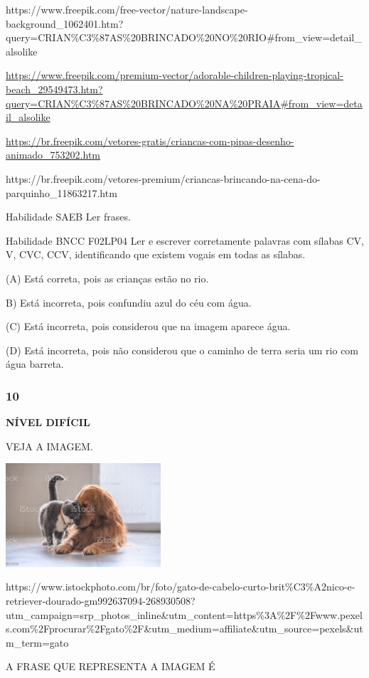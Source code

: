 https://www.freepik.com/free-vector/nature-landscape-background\_1062401.htm?query=CRIAN\%C3\%87AS\%20BRINCADO\%20NO\%20RIO\#from\_view=detail\_alsolike

\url{https://www.freepik.com/premium-vector/adorable-children-playing-tropical-beach_29549473.htm?query=CRIAN\%C3\%87AS\%20BRINCADO\%20NA\%20PRAIA\#from_view=detail_alsolike}

\url{https://br.freepik.com/vetores-gratis/criancas-com-pipas-desenho-animado_753202.htm}

https://br.freepik.com/vetores-premium/criancas-brincando-na-cena-do-parquinho\_11863217.htm

Habilidade SAEB Ler frases.

Habilidade BNCC F02LP04 Ler e escrever corretamente palavras com sílabas
CV, V, CVC, CCV, identificando que existem vogais em todas as sílabas.

(A) Está correta, pois as crianças estão no rio.

B) Está incorreta, pois confundiu azul do céu com água.

(C) Está incorreta, pois considerou que na imagem aparece água.

(D) Está incorreta, pois não considerou que o caminho de terra seria um
rio com água barreta.

\subsubsection{10 }\label{section-120}

\textbf{NÍVEL DIFÍCIL}

VEJA A IMAGEM.

\includegraphics[width=2.27539in,height=1.51515in]{media/image158.jpeg}

https://www.istockphoto.com/br/foto/gato-de-cabelo-curto-brit\%C3\%A2nico-e-retriever-dourado-gm992637094-268930508?utm\_campaign=srp\_photos\_inline\&utm\_content=https\%3A\%2F\%2Fwww.pexels.com\%2Fprocurar\%2Fgato\%2F\&utm\_medium=affiliate\&utm\_source=pexels\&utm\_term=gato

A FRASE QUE REPRESENTA A IMAGEM É

